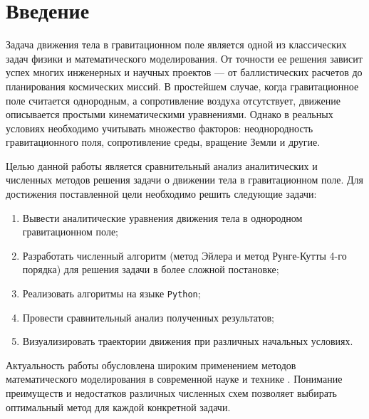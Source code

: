 \section{Введение}

Задача движения тела в гравитационном поле является одной из классических задач физики и математического моделирования. От точности ее решения зависит успех многих инженерных и научных проектов — от баллистических расчетов до планирования космических миссий. В простейшем случае, когда гравитационное поле считается однородным, а сопротивление воздуха отсутствует, движение описывается простыми кинематическими уравнениями. Однако в реальных условиях необходимо учитывать множество факторов: неоднородность гравитационного поля, сопротивление среды, вращение Земли и другие.

Целью данной работы является сравнительный анализ аналитических и численных методов решения задачи о движении тела в гравитационном поле. Для достижения поставленной цели необходимо решить следующие задачи:

\begin{enumerate}
    \item Вывести аналитические уравнения движения тела в однородном гравитационном поле;
    \item Разработать численный алгоритм (метод Эйлера и метод Рунге-Кутты 4-го порядка) для решения задачи в более сложной постановке;
    \item Реализовать алгоритмы на языке \texttt{Python};
    \item Провести сравнительный анализ полученных результатов;
    \item Визуализировать траектории движения при различных начальных условиях.
\end{enumerate}

Актуальность работы обусловлена широким применением методов математического моделирования в современной науке и технике \cite{bakhvalov2020, formalev2024}. Понимание преимуществ и недостатков различных численных схем позволяет выбирать оптимальный метод для каждой конкретной задачи.